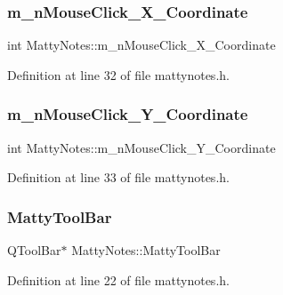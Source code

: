 \subsubsection{\texorpdfstring{m\+\_\+n\+Mouse\+Click\+\_\+\+X\+\_\+\+Coordinate}{m\_nMouseClick\_X\_Coordinate}}
{\footnotesize\ttfamily int Matty\+Notes\+::m\+\_\+n\+Mouse\+Click\+\_\+\+X\+\_\+\+Coordinate\hspace{0.3cm}{\ttfamily [private]}}



Definition at line 32 of file mattynotes.\+h.

\hypertarget{classMattyNotes_aa4b9e6a5553ad49e4389340a783a85b9}{}\label{classMattyNotes_aa4b9e6a5553ad49e4389340a783a85b9} 
\subsubsection{\texorpdfstring{m\+\_\+n\+Mouse\+Click\+\_\+\+Y\+\_\+\+Coordinate}{m\_nMouseClick\_Y\_Coordinate}}
{\footnotesize\ttfamily int Matty\+Notes\+::m\+\_\+n\+Mouse\+Click\+\_\+\+Y\+\_\+\+Coordinate\hspace{0.3cm}{\ttfamily [private]}}



Definition at line 33 of file mattynotes.\+h.

\hypertarget{classMattyNotes_ac780e9814bcce6c80afb9cc22d2b9af6}{}\label{classMattyNotes_ac780e9814bcce6c80afb9cc22d2b9af6} 
\subsubsection{\texorpdfstring{Matty\+Tool\+Bar}{MattyToolBar}}
{\footnotesize\ttfamily Q\+Tool\+Bar$\ast$ Matty\+Notes\+::\+Matty\+Tool\+Bar}



Definition at line 22 of file mattynotes.\+h.

\hypertarget{classMattyNotes_a489ab2a613831dd27ba01eccf323235a}{}\label{classMattyNotes_a489ab2a613831dd27ba01eccf323235a} 

